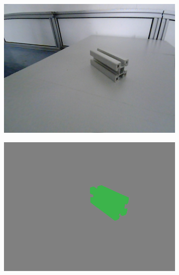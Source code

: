 	\begin{figure}[h]
		\centering
		\begin{subfigure}{.24\textwidth}
			\centering
			\includegraphics[width=1\linewidth]{images/sample_predictions/s40_40_G_013}
		\end{subfigure}
		\begin{subfigure}{.24\textwidth}
			\centering
			\includegraphics[width=1\linewidth]{images/sample_predictions/s40_40_G_013_size_gt}
		\end{subfigure}
		\begin{subfigure}{.24\textwidth}
			\centering

\end{subfigure}
\end{figure}

